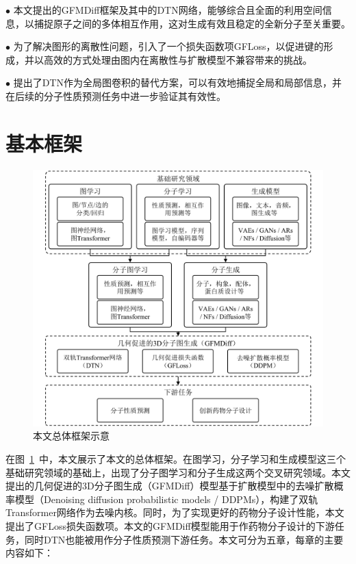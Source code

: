 $\bullet$ 本文提出的GFMDiff框架及其中的DTN网络，能够综合且全面的利用空间信息，以捕捉原子之间的多体相互作用，这对生成有效且稳定的全新分子至关重要。

$\bullet$ 为了解决图形的离散性问题，引入了一个损失函数项GFLoss，以促进键的形成，并以高效的方式处理由图内在离散性与扩散模型不兼容带来的挑战。

$\bullet$ 提出了DTN作为全局图卷积的替代方案，可以有效地捕捉全局和局部信息，并在后续的分子性质预测任务中进一步验证其有效性。

\section{基本框架}
\begin{figure}[h]
    \centering
    \includegraphics[width=\linewidth]{figures/overall_structure.png}
    \caption{本文总体框架示意}
    \label{fig:oa_struc}
  \end{figure}

在图~\ref{fig:oa_struc}~中，本文展示了本文的总体框架。在图学习，分子学习和生成模型这三个基础研究领域的基础上，出现了分子图学习和分子生成这两个交叉研究领域。本文提出的几何促进的3D分子图生成（GFMDiff）模型基于扩散模型中的去噪扩散概率模型（Denoising diffusion probabilistic models / DDPMs），构建了双轨Transformer网络作为去噪内核。同时，为了实现更好的药物分子设计性能，本文提出了GFLoss损失函数项。本文的GFMDiff模型能用于作药物分子设计的下游任务，同时DTN也能被用作分子性质预测下游任务。本文可分为五章，每章的主要内容如下：

